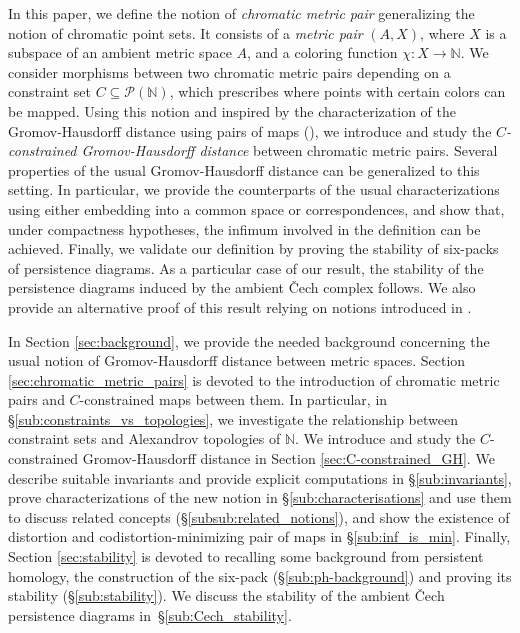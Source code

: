 \documentclass[8pt,a4paper,oneside,english,english]{article}
\theoremstyle{plain}
\theoremstyle
{plain}
\theoremstyle{definition}
\newcommand{\N}{\mathbb{N}}
\begin{document}
In this paper, we define the notion of {\em chromatic metric pair} generalizing the notion of chromatic point sets. It consists of a {\em metric pair} $(A,X)$, where $X$ is a subspace of an ambient metric space $A$, and a coloring function $\chi\colon X\to\N$.  We consider morphisms between two chromatic metric pairs depending on a constraint set $C\subseteq\mathcal P(\N)$, which prescribes where points with certain colors can be mapped. Using this notion and inspired by the characterization of the Gromov-Hausdorff distance using pairs of maps (\cite{KalOst}), we introduce and study the {\em $C$-constrained Gromov-Hausdorff distance} between chromatic metric pairs. Several properties of the usual Gromov-Hausdorff distance can be generalized to this setting. In particular, we provide the counterparts of the usual characterizations using either embedding into a common space or correspondences, and show that, under compactness hypotheses, the infimum involved in the definition can be achieved. Finally, we validate our definition by proving the stability of six-packs of persistence diagrams. As a particular case of our result, the stability of the persistence diagrams induced by the ambient \v{C}ech complex follows. We also provide an alternative proof of this result relying on notions introduced in \cite{Mem_tripods}.

\medskip

 In Section \ref{sec:background}, we provide the needed background concerning the usual notion of Gromov-Hausdorff distance between metric spaces. Section \ref{sec:chromatic_metric_pairs} is devoted to the introduction of chromatic metric pairs and $C$-constrained maps between them. In particular, in \S\ref{sub:constraints_vs_topologies}, we investigate the relationship between constraint sets and Alexandrov topologies of $\N$. We introduce and study the $C$-constrained Gromov-Hausdorff distance in Section \ref{sec:C-constrained_GH}. We describe suitable invariants and provide explicit computations in \S\ref{sub:invariants}, prove characterizations of the new notion in \S\ref{sub:characterisations} and use them to discuss related concepts (\S\ref{subsub:related_notions}), and show the existence of distortion and codistortion-minimizing pair of maps in \S\ref{sub:inf_is_min}. Finally, Section \ref{sec:stability} is devoted to recalling some background from persistent homology, the construction of the six-pack (\S\ref{sub:ph-background}) and proving its stability (\S\ref{sub:stability}). We discuss the stability of the ambient \v{C}ech persistence diagrams in~\S\ref{sub:Cech_stability}.
\end{document}
